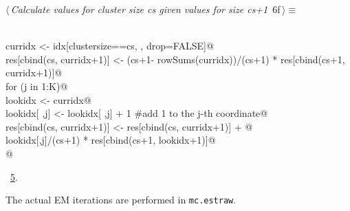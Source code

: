 \documentclass[reqno]{amsart}
\renewcommand{\NWtarget}[2]{\hypertarget{#1}{#2}}
\renewcommand{\NWlink}[2]{\hyperlink{#1}{#2}}
\begin{document}
\begin{flushleft} \small
\begin{minipage}{\linewidth}\label{scrap26}\raggedright\small
\NWtarget{nuweb6f}{} $\langle\,${\itshape Calculate values for cluster size cs given values for size cs+1}\nobreak\ {\footnotesize {6f}}$\,\rangle\equiv$
\vspace{-1ex}
\begin{list}{}{} \item
\mbox{}\verb@@\\
\mbox{}\verb@  curridx <- idx[clustersize==cs, , drop=FALSE]@\\
\mbox{}\verb@  res[cbind(cs, curridx+1)] <- (cs+1- rowSums(curridx))/(cs+1) * res[cbind(cs+1, curridx+1)]@\\
\mbox{}\verb@  for (j in 1:K){@\\
\mbox{}\verb@    lookidx <- curridx@\\
\mbox{}\verb@    lookidx[ ,j] <- lookidx[ ,j] + 1   #add 1 to the j-th coordinate@\\
\mbox{}\verb@    res[cbind(cs, curridx+1)] <- res[cbind(cs, curridx+1)] + @\\
\mbox{}\verb@                                 lookidx[,j]/(cs+1) * res[cbind(cs+1, lookidx+1)]@\\
\mbox{}\verb@  }  @\\
\mbox{}\verb@@{\NWsep}
\end{list}
\vspace{-1.5ex}
\footnotesize
\begin{list}{}{\setlength{\itemsep}{-\parsep}\setlength{\itemindent}{-\leftmargin}}
\item \NWtxtMacroRefIn\ \NWlink{nuweb5}{5}.

\item{}
\end{list}
\end{minipage}\vspace{4ex}
\end{flushleft}
The actual EM iterations are performed in \texttt{mc.estraw}. 
\end{document}

